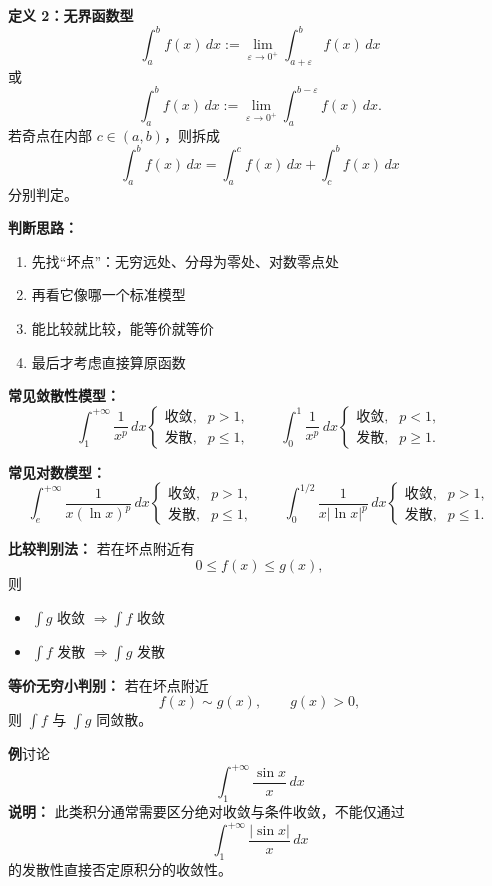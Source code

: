 \documentclass[12pt,a4paper]{ctexart}
\begin{document}
\textbf{定义 2：无界函数型}
\[
\int_a^b f(x)\,dx:=\lim_{\varepsilon\to 0^+}\int_{a+\varepsilon}^b f(x)\,dx
\]
或
\[
\int_a^b f(x)\,dx:=\lim_{\varepsilon\to 0^+}\int_a^{b-\varepsilon} f(x)\,dx.
\]
若奇点在内部 $c\in(a,b)$，则拆成
\[
\int_a^b f(x)\,dx
=
\int_a^c f(x)\,dx+\int_c^b f(x)\,dx
\]
分别判定。

\textbf{判断思路：}
\begin{enumerate}
  \item 先找“坏点”：无穷远处、分母为零处、对数零点处
  \item 再看它像哪一个标准模型
  \item 能比较就比较，能等价就等价
  \item 最后才考虑直接算原函数
\end{enumerate}

\textbf{常见敛散性模型：}
\[
\int_1^{+\infty}\frac1{x^p}\,dx
\begin{cases}
\text{收敛},&p>1,\\
\text{发散},&p\le 1,
\end{cases}
\qquad
\int_0^1\frac1{x^p}\,dx
\begin{cases}
\text{收敛},&p<1,\\
\text{发散},&p\ge 1.
\end{cases}
\]

\textbf{常见对数模型：}
\[
\int_e^{+\infty}\frac{1}{x(\ln x)^p}\,dx
\begin{cases}
\text{收敛},&p>1,\\
\text{发散},&p\le 1,
\end{cases}
\qquad
\int_0^{1/2}\frac{1}{x|\ln x|^p}\,dx
\begin{cases}
\text{收敛},&p>1,\\
\text{发散},&p\le 1.
\end{cases}
\]

\textbf{比较判别法：}
若在坏点附近有
\[
0\le f(x)\le g(x),
\]
则
\begin{itemize}
  \item $\int g$ 收敛 $\Rightarrow \int f$ 收敛
  \item $\int f$ 发散 $\Rightarrow \int g$ 发散
\end{itemize}

\textbf{等价无穷小判别：}
若在坏点附近
\[
f(x)\sim g(x),\qquad g(x)>0,
\]
则 $\int f$ 与 $\int g$ 同敛散。

\begin{examplebox}
\textbf{例}\quad 讨论
\[
\int_1^{+\infty}\frac{\sin x}{x}\,dx
\]
\textbf{说明：} 此类积分通常需要区分绝对收敛与条件收敛，不能仅通过
\[
\int_1^{+\infty}\frac{|\sin x|}{x}\,dx
\]
的发散性直接否定原积分的收敛性。
\end{examplebox}
\end{document}
